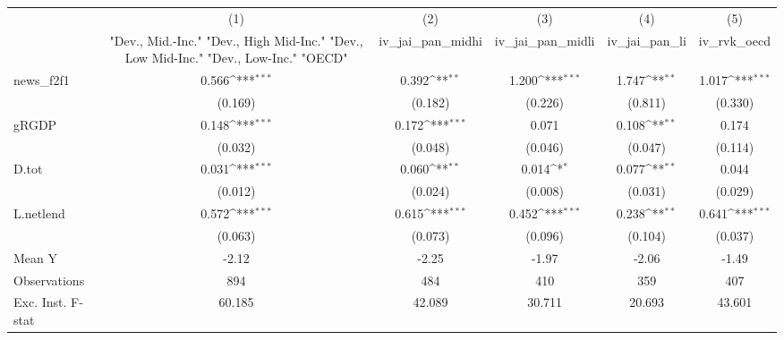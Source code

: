 {
\def\sym#1{\ifmmode^{#1}\else\(^{#1}\)\fi}
\begin{tabular}{l*{5}{c}}
\toprule
            &\multicolumn{1}{c}{(1)}&\multicolumn{1}{c}{(2)}&\multicolumn{1}{c}{(3)}&\multicolumn{1}{c}{(4)}&\multicolumn{1}{c}{(5)}\\
            &\multicolumn{1}{c}{ "Dev., Mid.-Inc." "Dev., High Mid-Inc." "Dev., Low Mid-Inc." "Dev., Low-Inc." "OECD" }&\multicolumn{1}{c}{iv\_jai\_pan\_midhi}&\multicolumn{1}{c}{iv\_jai\_pan\_midli}&\multicolumn{1}{c}{iv\_jai\_pan\_li}&\multicolumn{1}{c}{iv\_rvk\_oecd}\\
\midrule
news\_f2f1   &       0.566\sym{***}&       0.392\sym{**} &       1.200\sym{***}&       1.747\sym{**} &       1.017\sym{***}\\
            &     (0.169)         &     (0.182)         &     (0.226)         &     (0.811)         &     (0.330)         \\
\addlinespace
gRGDP       &       0.148\sym{***}&       0.172\sym{***}&       0.071         &       0.108\sym{**} &       0.174         \\
            &     (0.032)         &     (0.048)         &     (0.046)         &     (0.047)         &     (0.114)         \\
\addlinespace
D.tot       &       0.031\sym{***}&       0.060\sym{**} &       0.014\sym{*}  &       0.077\sym{**} &       0.044         \\
            &     (0.012)         &     (0.024)         &     (0.008)         &     (0.031)         &     (0.029)         \\
\addlinespace
L.netlend   &       0.572\sym{***}&       0.615\sym{***}&       0.452\sym{***}&       0.238\sym{**} &       0.641\sym{***}\\
            &     (0.063)         &     (0.073)         &     (0.096)         &     (0.104)         &     (0.037)         \\
\midrule
Mean Y      &       -2.12         &       -2.25         &       -1.97         &       -2.06         &       -1.49         \\
Observations&         894         &         484         &         410         &         359         &         407         \\
Exc. Inst. F-stat&      60.185         &      42.089         &      30.711         &      20.693         &      43.601         \\
\bottomrule
\end{tabular}
}
